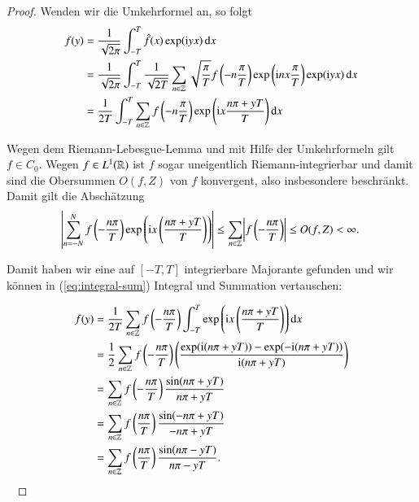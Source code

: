 \begin{proof}
  Wenden wir die Umkehrformel an, so folgt
  \begin{equation}
    \label{eq:integral-sum}
    \begin{split}
      f(y)
      &= \frac{1}{\sqrt{2\pi}} \int_{-T}^T{\fouriertransform{f}(x) \exp(\i yx) \dif x} \\
      &= \frac{1}{\sqrt{2\pi}} \int_{-T}^T{\frac{1}{\sqrt{2T}} \sum_{n \in \Z}{\sqrt{\frac{\pi}{T}} f\left(-n\frac{\pi}{T} \right) \exp\left(\i n x\frac{\pi}{T}\right)} \exp(\i yx)\dif x} \\
      &= \frac{1}{2T}\int_{-T}^T{\sum_{n \in \Z}{f\left(-n\frac{\pi}{T}\right) \exp\left(\i x\frac{n\pi + yT}{T}\right)} \dif x}
    \end{split}
  \end{equation}

  Wegen dem Riemann-Lebesgue-Lemma und mit Hilfe der Umkehrformeln gilt $f \in C_0$.
  Wegen $f \in L^1(\mathbb{R})$ ist $f$ sogar uneigentlich Riemann-integrierbar und damit sind die Obersummen $O(f,Z)$ von $f$ konvergent, also insbesondere beschränkt.
  Damit gilt die Abschätzung
  \begin{equation*}
    \abs{\sum_{n=-N}^N{f \left(- \frac{n\pi}{T} \right) \exp \left( \mathrm{i} x \left( \frac{n\pi + yT}{T} \right) \right)}}
    \leq \sum_{n \in \mathbb{Z}}{\abs{f \left( -\frac{n\pi}{T} \right)}}
    \leq O(f,Z)
    < \infty.
  \end{equation*}

  Damit haben wir eine auf $[-T,T]$ integrierbare Majorante gefunden und wir können in (\ref{eq:integral-sum}) Integral und Summation vertauschen:

  \begin{equation*}
    \begin{split}
      f(y)
      &= \frac{1}{2T} \sum_{n \in \Z}{f \left(-\frac{n\pi}{T}\right) \int_{-T}^T{\exp \left(\i x \left( \frac{n\pi + yT}{T} \right) \right) \dif x}} \\
      &= \frac{1}{2} \sum_{n \in \Z}{f \left(-\frac{n\pi}{T} \right) \left(\frac{\exp(\i(n\pi + yT)) - \exp(-\i(n\pi + yT))}{\i(n\pi + yT)} \right)} \\
      &= \sum_{n \in \Z}{f \left(-\frac{n\pi}{T}\right)\frac{\sin(n\pi + yT)}{n\pi + yT}} \\
      &= \sum_{n \in \Z}{f \left(\frac{n\pi}{T} \right) \frac{\sin(-n\pi + yT)}{-n\pi + yT}} \\
      &= \sum_{n \in \Z}{f \left(\frac{n\pi}{T} \right) \frac{\sin(n\pi - yT)}{n\pi - yT}}.
    \end{split}
  \end{equation*}
  \qedhere \ 
\end{proof}
